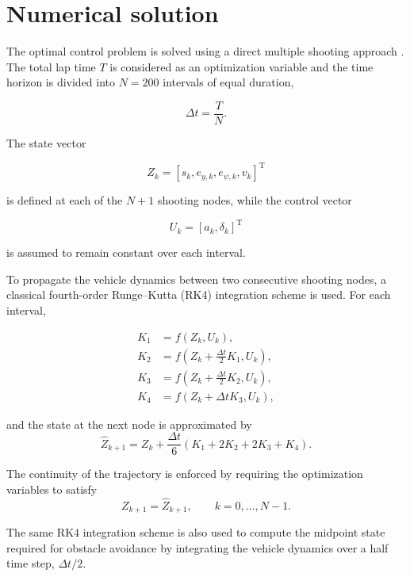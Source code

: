 \section{Numerical solution}

The optimal control problem is solved using a direct multiple shooting approach \cite{bock1984multiple}. The total lap time \(T\) is considered as an optimization variable and the time horizon is divided into \(N=200\) intervals of equal duration,

\begin{equation}
    \Delta t = \frac{T}{N}.
\end{equation}

The state vector

\[
Z_k=[s_k,e_{y,k},e_{\psi,k},v_k]^{\mathrm T}
\]

is defined at each of the \(N+1\) shooting nodes, while the control vector

\[
U_k=[a_k,\delta_k]^{\mathrm T}
\]

is assumed to remain constant over each interval.

To propagate the vehicle dynamics between two consecutive shooting nodes, a classical fourth-order Runge--Kutta (RK4) integration scheme is used. For each interval,

\begin{align}
    K_1 &= f(Z_k,U_k),\\
    K_2 &= f\left(Z_k+\frac{\Delta t}{2}K_1,U_k\right),\\
    K_3 &= f\left(Z_k+\frac{\Delta t}{2}K_2,U_k\right),\\
    K_4 &= f\left(Z_k+\Delta t K_3,U_k\right),
\end{align}

and the state at the next node is approximated by
\begin{equation}
    \widehat{Z}_{k+1}
    =
    Z_k
    +
    \frac{\Delta t}{6}
    \left(
        K_1+2K_2+2K_3+K_4
    \right).
\end{equation}

The continuity of the trajectory is enforced by requiring the optimization variables to satisfy
\begin{equation}
    Z_{k+1}=\widehat{Z}_{k+1},
    \qquad k=0,\ldots,N-1.
\end{equation}

The same RK4 integration scheme is also used to compute the midpoint state required for obstacle avoidance by integrating the vehicle dynamics over a half time step, $\Delta t/2$.

